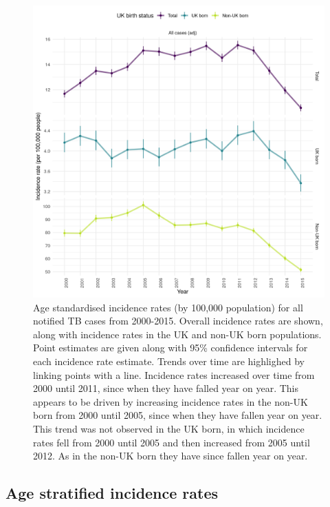 \documentclass[11pt,twoside]{bristolthesis}
\begin{document}
  \begin{figure}
  
  {\centering \includegraphics[width=0.8\linewidth,]{chapters/tb-epi-england/figures/plot-overall-inc-rates} 
  
  }
  
  \caption[Age standardised incidence rates (by 100,000 population) for all notified TB cases from 2000-2015.]{Age standardised incidence rates (by 100,000 population) for all notified TB cases from 2000-2015. Overall incidence rates are shown, along with incidence rates in the UK and non-UK born populations. Point estimates are given along with 95\% confidence intervals for each incidence rate estimate. Trends over time are highlighed by linking points with a line. Incidence rates increased over time from 2000 until 2011, since when they have falled year on year. This appears to be driven by increasing incidence rates in the non-UK born from 2000 until 2005, since when they have fallen year on year. This trend was not observed in the UK born, in which incidence rates fell from 2000 until 2005 and then increased from 2005 until 2012. As in the non-UK born they have since fallen year on year.}\label{fig:plot-overall-inc-rates}
  \end{figure}
  \hypertarget{age-stratified-incidence-rates}{%
  \subsection{Age stratified incidence rates}\label{age-stratified-incidence-rates}}
  
\end{document}

